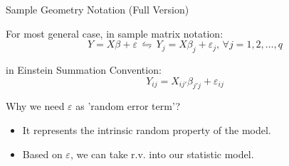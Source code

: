 \begin{point}
    Sample Geometry Notation (Full Version)
\end{point}

    For most general case, in sample matrix notation:
    \begin{equation}
        Y=X\beta+\varepsilon \,\leftrightharpoons\, Y_j=X\beta _j+\varepsilon _j,\,\forall j=1,2,\ldots,q
    \end{equation}
    
    in Einstein Summation Convention:
    \begin{equation}
        Y_{ij}=X_{ij'}\beta _{j'j} +\varepsilon _{ij}
    \end{equation}

    Why we need $ \varepsilon $ as 'random error term'?
    \begin{itemize}[topsep=3pt,itemsep=1pt]
        \item It represents the intrinsic random property of the model.
        \item Based on $ \varepsilon  $, we can take r.v. into our statistic model.
    \end{itemize}
    
